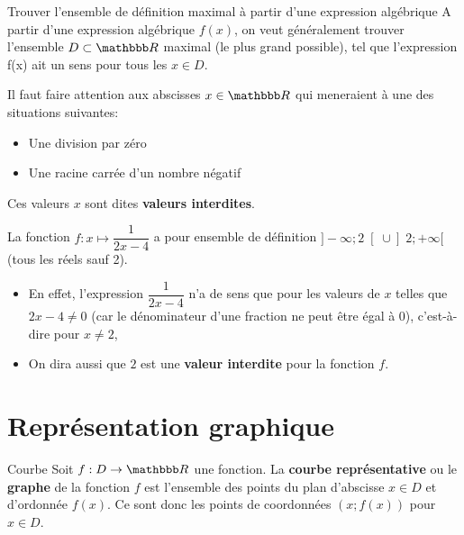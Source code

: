 \documentclass[10pt,a4paper,openany,twoside,prof]{book}
\begin{document}
\begin{methode}{Trouver l'ensemble de définition maximal à partir d'une expression algébrique}{}
    A partir d'une expression algébrique $f(x)$, on veut généralement trouver l'ensemble $D\subset\R$ maximal (le plus grand possible), tel que l'expression f(x) ait un sens pour tous les $x\in D$.

    Il faut faire attention aux abscisses $x\in\R$ qui meneraient à une des situations suivantes:
    \begin{itemize}
        \item Une division par zéro
        \item Une racine carrée d'un nombre négatif
    \end{itemize}

    Ces valeurs $x$ sont dites \textbf{valeurs interdites}.
\end{methode}

\begin{ex}{}{}
    La fonction $f:x \mapsto \dfrac{1}{2x-4}$ a pour ensemble de définition $] - \infty ; 2\; [\; \cup ]\;2 ;+ \infty [$ (tous les réels sauf 2).
    \begin{itemize}
        \item  En effet, l'expression $\dfrac{1}{2x-4}$ n'a de sens que pour les valeurs de $x$ telles que $2x-4\neq 0$ (car le dénominateur d'une fraction ne peut être égal à 0), c'est-à-dire pour $x \neq 2$,
        \item  On dira aussi que $2$ est une \textbf{valeur interdite} pour la fonction $f$.
    \end{itemize}
\end{ex}


\section{Représentation graphique}

\begin{defi}{Courbe}{}
  Soit $f:D\rightarrow\R$ une fonction. La \textbf{courbe représentative} ou le \textbf{graphe} de la fonction $f$ est l'ensemble des points du plan d'abscisse $x\in D$ et d'ordonnée $f(x)$. Ce sont donc les points de coordonnées $(x; f(x))$ pour $x\in D$.
\end{defi}
\end{document}
